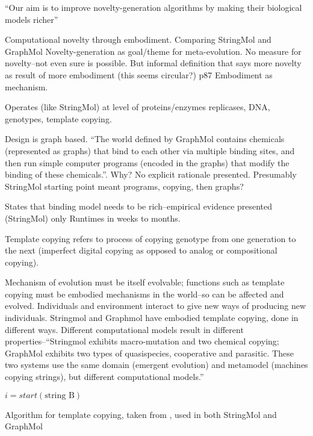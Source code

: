 \begin{NOTES}
``Our aim is to improve novelty-generation algorithms by making their biological models richer''

Computational novelty through embodiment. Comparing StringMol and GraphMol
Novelty-generation as goal/theme for meta-evolution. No measure for novelty--not even sure is possible. But informal definition that says more novelty as result of more embodiment (this seems circular?) p87 Embodiment as mechanism. 

Operates (like StringMol) at level of proteins/enzymes \eg replicases, DNA, genotypes, template copying.

Design is graph based. ``The world defined by GraphMol contains chemicals (represented as graphs) that bind to each other via multiple binding sites, and then run simple computer programs (encoded in the graphs) that modify the binding of these chemicals.''. Why? No explicit rationale presented. Presumably StringMol starting point meant programs, copying, then graphs? 

States that binding model needs to be rich--empirical evidence presented (StringMol) only
Runtimes in weeks to months.

Template copying refers to process of copying genotype from one generation to the next (imperfect digital copying as opposed to analog or compositional copying).

Mechanism of evolution must be itself evolvable; functions such as template copying must be embodied mechanisms in the world--so can be affected and evolved.
Individuals and environment interact to give new ways of producing new individuals.
Stringmol and Graphmol have embodied template copying, done in different ways. Different computational models result in different properties--``Stringmol exhibits macro-mutation and two chemical copying; GraphMol exhibits two types of quasispecies, cooperative and parasitic. These two systems use the same domain (emergent evolution) and metamodel (machines copying strings), but different computational models.''


\begin{algorithm}[ht]
$i=start(\text{string B})$\;
\caption{Algorithm for template copying, taken from \cite{Nellis2014}, used in both StringMol and GraphMol}
\end{algorithm}


\end{NOTES}
